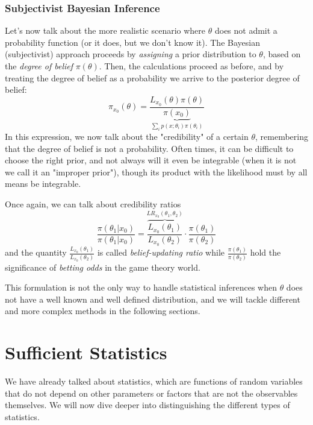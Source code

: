 \subsubsection{Subjectivist Bayesian Inference}

Let's now talk about the more realistic scenario where $\theta$ does not admit a probability function (or it does, but we don't know it). The Bayesian (subjectivist) approach proceeds by \emph{assigning} a prior distribution to $\theta$, based on the \emph{degree of belief} $\pi(\theta)$. Then, the calculations proceed as before, and by treating the degree of belief as a probability we arrive to the posterior degree of belief:
\begin{equation}
	\pi_{x_0}(\theta) = \frac{L_{x_0}(\theta)\pi(\theta)}{\underbrace{\pi(x_0)}_{\sum_i p(x;\theta_i)\pi(\theta_i)}}
\label{eq:posterior_dob}
\end{equation}
In this expression, we now talk about the "credibility" of a certain $\theta$, remembering that the degree of belief is not a probability. Often times, it can be difficult to choose the right prior, and not always will it even be integrable (when it is not we call it an "improper prior"), though its product with the likelihood must by all means be integrable. 


Once again, we can talk about credibility ratios
 	\[
	\frac{\pi(\theta_1|x_0)}{\pi(\theta_1|x_0)} = \overbrace{\frac{L_{x_0}(\theta_1)}{L_{x_0}(\theta_2)}}^{LR_{x_0}(\theta_1,\theta_2)} \cdot \frac{\pi(\theta_1)}{\pi(\theta_2)}
	\]
 and the quantity $\frac{L_{x_0}(\theta_1)}{L_{x_0}(\theta_2)}$ is called \emph{belief-updating ratio} while $\frac{\pi(\theta_1)}{\pi(\theta_2)}$ hold the significance of \emph{betting odds} in the game theory world.
 
 This formulation is not the only way to handle statistical inferences when $\theta$ does not have a well known and well defined distribution, and we will tackle different and more complex methods in the following sections.

\section{Sufficient Statistics}

We have already talked about statistics, which are functions of random variables that do not depend on other parameters or factors that are not the observables themselves. We will now dive deeper into distinguishing the different types of statistics. 

